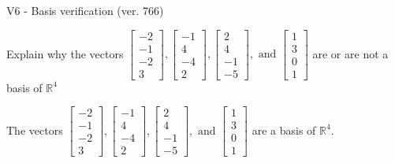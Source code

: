 \begin{exercise}
  \begin{exerciseTitle}V6 - Basis verification (ver. 766)\end{exerciseTitle}
  \begin{exerciseStatement}
    Explain why the vectors \(\left[\begin{array}{r}
-2 \\
-1 \\
-2 \\
3
\end{array}\right] , \left[\begin{array}{r}
-1 \\
4 \\
-4 \\
2
\end{array}\right] , \left[\begin{array}{r}
2 \\
4 \\
-1 \\
-5
\end{array}\right] , \text{ and } \left[\begin{array}{r}
1 \\
3 \\
0 \\
1
\end{array}\right]\) are or are not a basis of \(\mathbb{R}^4\)	


  \end{exerciseStatement}
  \begin{exerciseAnswer}
   The vectors \(\left[\begin{array}{r}
-2 \\
-1 \\
-2 \\
3
\end{array}\right] , \left[\begin{array}{r}
-1 \\
4 \\
-4 \\
2
\end{array}\right] , \left[\begin{array}{r}
2 \\
4 \\
-1 \\
-5
\end{array}\right] , \text{ and } \left[\begin{array}{r}
1 \\
3 \\
0 \\
1
\end{array}\right]\) 
  	 are  a basis of \(\mathbb{R}^4\).
  


  \end{exerciseAnswer}
\end{exercise}